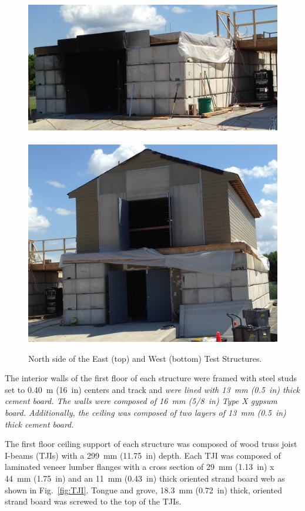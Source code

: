 \documentclass[12pt,oneside]{book}
\begin{document}
\begin{figure}[!ht]
	\includegraphics[width=5.25in]{../Figures/Pictures/east_structure}
	\\~\\
	\includegraphics[width=5.25in]{../Figures/Pictures/west_structure}
	\caption[North side of the East and West Structures.]{North side of the East (top) and West (bottom) Test Structures.}
	\label{fig:struct_pics}
\end{figure}

The interior walls of the first floor of each structure were framed with steel studs set to 0.40~m (16~in) centers and track and \textit{were lined with 13~mm (0.5~in) thick cement board. The walls were composed of 16~mm (5/8~in) Type X gypsum board. Additionally, the ceiling was composed of two layers of 13~mm (0.5~in) thick cement board.}
\FloatBarrier

The first floor ceiling support of each structure was composed of wood truss joist I-beams (TJIs) with a 299~mm (11.75~in) depth. Each TJI was composed of laminated veneer lumber flanges with a cross section of 29~mm (1.13~in) x 44~mm (1.75~in) and an 11~mm (0.43~in) thick oriented strand board web as shown in Fig.~\ref{fig:TJI}. Tongue and grove, 18.3~mm (0.72~in) thick, oriented strand board was screwed to the top of the TJIs.
\end{document}
